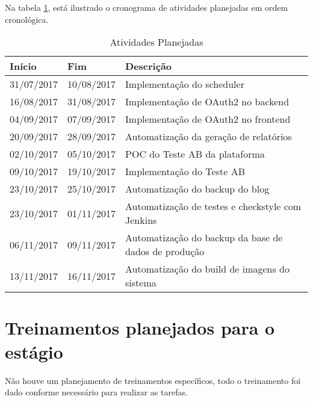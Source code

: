 Na tabela \ref{tab:tabPlan}, está ilustrado o cronograma de atividades planejadas em ordem cronológica.\\

\begin{table}[H]
\begin{center}
\caption[Atividades Planejadas]
{Atividades Planejadas}\label{tab:tabPlan}

\begin{tabular}{llp{7cm}} \hline

\hline
\textbf{Início}    & \textbf{Fim} &  \textbf{Descrição}                             \\
\hline
31/07/2017        & 10/08/2017      & Implementação do \gls{scheduler}\\
16/08/2017        & 31/08/2017      & Implementação de \gls{OAuth2} no \gls{backend}\\
04/09/2017        & 07/09/2017      & Implementação de \gls{OAuth2} no \gls{frontend}\\
20/09/2017        & 28/09/2017      & Automatização da geração de relatórios\\
02/10/2017        & 05/10/2017      & \gls{POC} do \gls{Teste AB} da plataforma\\
09/10/2017        & 19/10/2017      & Implementação do \gls{Teste AB}\\
23/10/2017        & 25/10/2017      & Automatização do \gls{backup} do blog\\
23/10/2017        & 01/11/2017      & Automatização de testes e \gls{checkstyle} com \gls{Jenkins}\\
06/11/2017        & 09/11/2017      & Automatização do \gls{backup} da base de dados de produção\\
13/11/2017        & 16/11/2017      & Automatização do build de imagens do sistema\\
\hline

\hline
\end{tabular}
\end{center}
\end{table}

\section{Treinamentos planejados para o estágio}

Não houve um planejamento de treinamentos específicos, todo o treinamento foi dado conforme necessário para realizar as tarefas.\\

